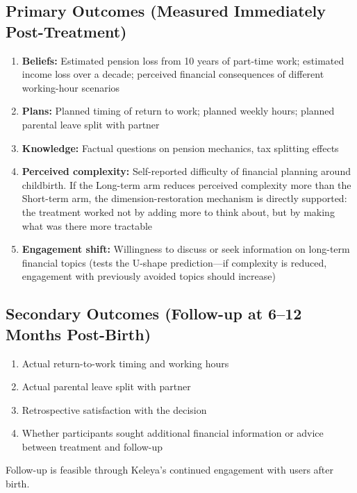 \documentclass[12pt,a4paper]{article}
\begin{document}
\subsection{Primary Outcomes (Measured Immediately Post-Treatment)}

\begin{enumerate}[nosep]
    \item \textbf{Beliefs:} Estimated pension loss from 10 years of part-time work; estimated income loss over a decade; perceived financial consequences of different working-hour scenarios
    \item \textbf{Plans:} Planned timing of return to work; planned weekly hours; planned parental leave split with partner
    \item \textbf{Knowledge:} Factual questions on pension mechanics, tax splitting effects
    \item \textbf{Perceived complexity:} Self-reported difficulty of financial planning around childbirth. If the Long-term arm reduces perceived complexity more than the Short-term arm, the dimension-restoration mechanism is directly supported: the treatment worked not by adding more to think about, but by making what was there more tractable
    \item \textbf{Engagement shift:} Willingness to discuss or seek information on long-term financial topics (tests the U-shape prediction---if complexity is reduced, engagement with previously avoided topics should increase)
\end{enumerate}

\subsection{Secondary Outcomes (Follow-up at 6--12 Months Post-Birth)}

\begin{enumerate}[nosep]
    \item Actual return-to-work timing and working hours
    \item Actual parental leave split with partner
    \item Retrospective satisfaction with the decision
    \item Whether participants sought additional financial information or advice between treatment and follow-up
\end{enumerate}

Follow-up is feasible through Keleya's continued engagement with users after birth.
\end{document}
